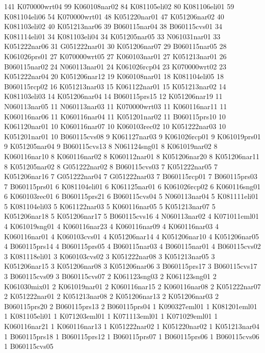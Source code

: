 141 K070000wrt04
     99 K060108nar02
     84 K081105eli02
     80 K081106eli01
     59 K081104eli06
     54 K070000wrt01
     48 K051220nar01
     47 K051206nar02
     40 K081103eli02
     40 K051213nar06
     39 B060115nar04
     38 B060115cvs01
     34 K081114eli01
     34 K081103eli04
     34 K051205nar05
     33 N061031nar01
     33 K051222nar06
     31 G051222nar01
     30 K051206nar07
     29 B060115nar05
     28 K061026prs01
     27 K070000wrt05
     27 K060103nar01
     27 K051213nar01
     26 B060115nar02
     24 N060113nar01
     24 K061026rcp04
     23 K070000wrt02
     23 K051222nar04
     20 K051206nar12
     19 K060108nar01
     18 K081104eli05
     18 B060115rcp02
     16 K051213nar03
     15 K061122nar01
     15 K051213nar02
     14 K081103eli03
     14 K051206nar04
     14 B060115prs15
     12 K051206nar19
     11 N060113nar05
     11 N060113nar03
     11 K070000wrt03
     11 K060116nar11
     11 K060116nar06
     11 K060116nar04
     11 K051201nar02
     11 B060115prs10
     10 K061120nar01
     10 K060116nar07
     10 K060103rec02
     10 K051222nar03
     10 K051201nar01
     10 B060115cvs08
      9 K061127nar03
      9 K061026rcp01
      9 K061019prs01
      9 K051205nar04
      9 B060115cvs13
      8 N061124sng01
      8 K061019nar02
      8 K060116nar10
      8 K060116nar02
      8 K060112nar01
      8 K051206nar20
      8 K051206nar11
      8 K051205nar02
      8 G051222nar02
      8 B060115cvs03
      7 K051222nar05
      7 K051206nar16
      7 G051222nar04
      7 G051222nar03
      7 B060115rcp01
      7 B060115prs03
      7 B060115prs01
      6 K081104eli01
      6 K061125nar01
      6 K061026rcp02
      6 K060116sng01
      6 K060103rec01
      6 B060115prs21
      6 B060115cvs04
      5 N060113nar04
      5 K081111eli01
      5 K081104eli03
      5 K061122nar03
      5 K060116nar05
      5 K051213nar07
      5 K051206nar18
      5 K051206nar17
      5 B060115cvs16
      4 N060113nar02
      4 K071011eml01
      4 K061019sng01
      4 K060116nar23
      4 K060116nar09
      4 K060116nar03
      4 K060116nar01
      4 K060103cvs01
      4 K051206nar14
      4 K051206nar10
      4 K051206nar05
      4 B060115prs14
      4 B060115prs05
      4 B060115nar03
      4 B060115nar01
      4 B060115cvs02
      3 K081118eli01
      3 K060103cvs02
      3 K051222nar08
      3 K051213nar05
      3 K051206nar15
      3 K051206nar08
      3 K051206nar06
      3 B060115prs17
      3 B060115cvs17
      3 B060115cvs09
      3 B060115cvs07
      2 K061123sng03
      2 K061123sng01
      2 K061030mix01
      2 K061019nar01
      2 K060116nar15
      2 K060116nar08
      2 K051222nar07
      2 K051222nar01
      2 K051213nar08
      2 K051206nar13
      2 K051206nar03
      2 B060115prs20
      2 B060115prs13
      2 B060115prs04
      1 K090327eml01
      1 K081201eml01
      1 K081105eli01
      1 K071203eml01
      1 K071113eml01
      1 K071029eml01
      1 K060116nar21
      1 K060116nar13
      1 K051222nar02
      1 K051220nar02
      1 K051213nar04
      1 B060115prs18
      1 B060115prs12
      1 B060115prs07
      1 B060115prs06
      1 B060115cvs06
      1 B060115cvs05
